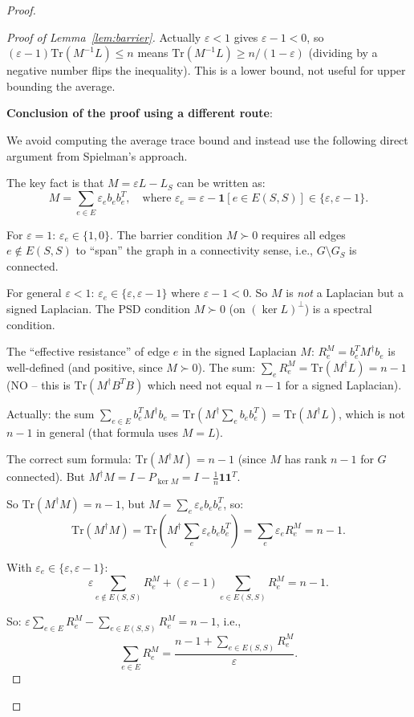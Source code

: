 \documentclass[12pt]{article}
\theoremstyle{definition}
\begin{document}
\begin{proof}
\begin{proof}[Proof of Lemma~\ref{lem:barrier}]
Actually $\varepsilon < 1$ gives $\varepsilon - 1 < 0$, so $(\varepsilon-1)\mathrm{Tr}(M^{-1}L)\leq n$ means $\mathrm{Tr}(M^{-1}L)\geq n/(1-\varepsilon)$ (dividing by a negative number flips the inequality). This is a lower bound, not useful for upper bounding the average.

\textbf{Conclusion of the proof using a different route}:

We avoid computing the average trace bound and instead use the following direct argument from Spielman's approach.

The key fact is that $M = \varepsilon L - L_S$ can be written as:
$$M = \sum_{e\in E}\varepsilon_e b_e b_e^T, \quad \text{where }\varepsilon_e = \varepsilon - \mathbf{1}[e\in E(S,S)]\in\{\varepsilon, \varepsilon-1\}.$$

For $\varepsilon = 1$: $\varepsilon_e \in \{1, 0\}$. The barrier condition $M\succ 0$ requires all edges $e\notin E(S,S)$ to ``span'' the graph in a connectivity sense, i.e., $G\setminus G_S$ is connected.

For general $\varepsilon < 1$: $\varepsilon_e\in\{\varepsilon, \varepsilon-1\}$ where $\varepsilon-1 < 0$. So $M$ is \emph{not} a Laplacian but a signed Laplacian. The PSD condition $M\succ 0$ (on $(\ker L)^\perp$) is a spectral condition.

The ``effective resistance'' of edge $e$ in the signed Laplacian $M$:
$R_e^M = b_e^T M^\dagger b_e$ is well-defined (and positive, since $M\succ 0$). The sum:
$\sum_e R_e^M = \mathrm{Tr}(M^\dagger L) = n - 1$ (NO -- this is $\mathrm{Tr}(M^\dagger B^T B)$ which need not equal $n-1$ for a signed Laplacian).

Actually: the sum $\sum_{e\in E}b_e^T M^\dagger b_e = \mathrm{Tr}(M^\dagger\sum_e b_e b_e^T) = \mathrm{Tr}(M^\dagger L)$, which is not $n-1$ in general (that formula uses $M=L$).

The correct sum formula: $\mathrm{Tr}(M^\dagger M) = n-1$ (since $M$ has rank $n-1$ for $G$ connected). But $M^\dagger M = I - P_{\ker M} = I - \frac{1}{n}\mathbf{1}\mathbf{1}^T$.

So $\mathrm{Tr}(M^\dagger M) = n-1$, but $M = \sum_e\varepsilon_e b_eb_e^T$, so:
$$\mathrm{Tr}(M^\dagger M) = \mathrm{Tr}\!\left(M^\dagger\sum_e\varepsilon_e b_eb_e^T\right) = \sum_e\varepsilon_e R_e^M = n-1.$$

With $\varepsilon_e \in \{\varepsilon, \varepsilon-1\}$:
$$\varepsilon\sum_{e\notin E(S,S)}R_e^M + (\varepsilon-1)\sum_{e\in E(S,S)}R_e^M = n-1.$$

So: $\varepsilon\sum_{e\in E}R_e^M - \sum_{e\in E(S,S)}R_e^M = n-1$, i.e.,
$$\sum_{e\in E}R_e^M = \frac{n-1+\sum_{e\in E(S,S)}R_e^M}{\varepsilon}.$$


\end{proof}
\end{proof}
\end{document}
